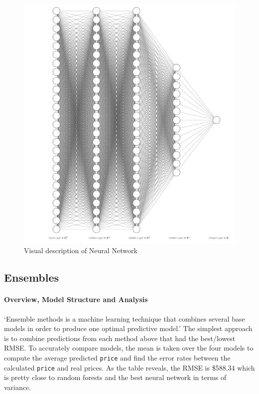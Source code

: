 \documentclass[
  paper=a4,
  ,captions=tableheading
]{scrartcl}
\begin{document}
\begin{figure}
\centering
\includegraphics{NN_rep.jpeg}
\caption{Visual description of Neural Network}
\end{figure}

\hypertarget{ensembles}{%
\subsection{Ensembles}\label{ensembles}}

\hypertarget{overview-model-structure-and-analysis}{%
\paragraph{Overview, Model Structure and
Analysis}\label{overview-model-structure-and-analysis}}

`Ensemble methods is a machine learning technique that combines several
base models in order to produce one optimal predictive model.' The
simplest approach is to combine predictions from each method above that
had the best/lowest RMSE. To accurately compare models, the mean is
taken over the four models to compute the average predicted
\texttt{price} and find the error rates between the calculated
\texttt{price} and real prices. As the table reveals, the RMSE is
\$588.34 which is pretty close to random forests and the best neural
network in terms of variance.
\end{document}
